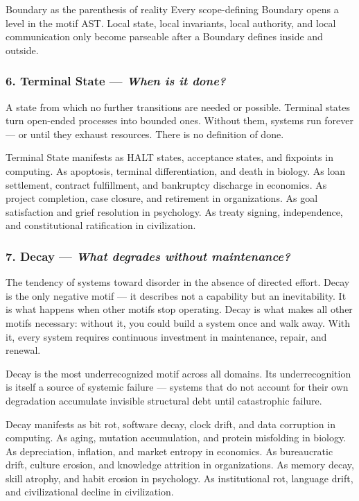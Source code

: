 \documentclass[11pt,a4paper]{article}
\newcommand{\question}[1]{\textit{#1}}
\begin{document}
\begin{principlebox}{Boundary as the parenthesis of reality}
Every scope-defining Boundary opens a level in the motif AST. Local state, local invariants, local authority, and local communication only become parseable after a Boundary defines inside and outside.
\end{principlebox}

\subsubsection{6. Terminal State --- \question{When is it done?}}

A state from which no further transitions are needed or possible. Terminal states turn open-ended processes into bounded ones. Without them, systems run forever --- or until they exhaust resources. There is no definition of done.

Terminal State manifests as HALT states, acceptance states, and fixpoints in computing. As apoptosis, terminal differentiation, and death in biology. As loan settlement, contract fulfillment, and bankruptcy discharge in economics. As project completion, case closure, and retirement in organizations. As goal satisfaction and grief resolution in psychology. As treaty signing, independence, and constitutional ratification in civilization.

\subsubsection{7. Decay --- \question{What degrades without maintenance?}}

The tendency of systems toward disorder in the absence of directed effort. Decay is the only negative motif --- it describes not a capability but an inevitability. It is what happens when other motifs stop operating. Decay is what makes all other motifs necessary: without it, you could build a system once and walk away. With it, every system requires continuous investment in maintenance, repair, and renewal.

Decay is the most underrecognized motif across all domains. Its underrecognition is itself a source of systemic failure --- systems that do not account for their own degradation accumulate invisible structural debt until catastrophic failure.

Decay manifests as bit rot, software decay, clock drift, and data corruption in computing. As aging, mutation accumulation, and protein misfolding in biology. As depreciation, inflation, and market entropy in economics. As bureaucratic drift, culture erosion, and knowledge attrition in organizations. As memory decay, skill atrophy, and habit erosion in psychology. As institutional rot, language drift, and civilizational decline in civilization.
\end{document}
